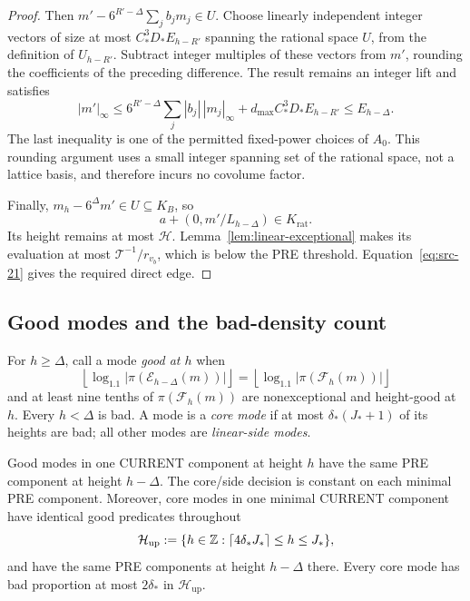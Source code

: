 \begin{proof}
Then \(m'-6^{R'-\Delta}\sum_jb_jm_j\in U\).
Choose linearly independent integer vectors of size at most
\(C_*^3D_*E_{h-R'}\) spanning the rational space \(U\), from the
definition of \(U_{h-R'}\).  Subtract integer multiples of these
vectors from \(m'\), rounding the coefficients of the preceding
difference.  The result remains an integer lift and satisfies
\[
 |m'|_\infty
 \le 6^{R'-\Delta}\sum_j|b_j|\,|m_j|_\infty
       +d_{\max}C_*^3D_*E_{h-R'}
 \le E_{h-\Delta}.
\]
The last inequality is one of the permitted fixed-power choices of
\(A_0\).  This rounding argument uses a small integer spanning set
of the rational space, not a lattice basis, and therefore incurs no
covolume factor.

Finally, \(m_h-6^\Delta m'\in U\subseteq K_B\), so
\[
 a+(0,m'/L_{h-\Delta})\in K_{\mathrm{rat}}.
\]
Its height remains at most \(\mathcal H\).
Lemma~\ref{lem:linear-exceptional} makes its evaluation at most
\(\mathcal T^{-1}/r_{v_b}\), which is below the PRE threshold.
Equation~\eqref{eq:src-21} gives the required direct edge.
\end{proof}

\subsection{Good modes and the bad-density count}

For \(h\ge\Delta\), call a mode \emph{good at \(h\)} when
\[
 \left\lfloor\log_{1.1}
       |\pi(\mathcal E_{h-\Delta}(m))|\right\rfloor
 =
 \left\lfloor\log_{1.1}
       |\pi(\mathcal F_h(m))|\right\rfloor
\]
and at least nine tenths of \(\pi(\mathcal F_h(m))\) are
nonexceptional and height-good at \(h\).
Every \(h<\Delta\) is bad.  A mode is a \emph{core mode} if at most
\(\delta_*(J_*+1)\) of its heights are bad; all other modes are
\emph{linear-side modes}.

\begin{lemma}
\label{lem:good-predicates}
Good modes in one CURRENT component at height \(h\) have the same
PRE component at height \(h-\Delta\).  The core/side decision is
constant on each minimal PRE component.  Moreover, core modes in
one minimal CURRENT component have identical good predicates
throughout
\[
 \mathcal H_{\mathrm{up}}
   :=\{h\in\mathbb Z:\lceil4\delta_*J_*\rceil\le h\le J_*\},
\]
and have the same PRE components at height \(h-\Delta\) there.
Every core mode has bad proportion at most \(2\delta_*\) in
\(\mathcal H_{\mathrm{up}}\).
\end{lemma}

